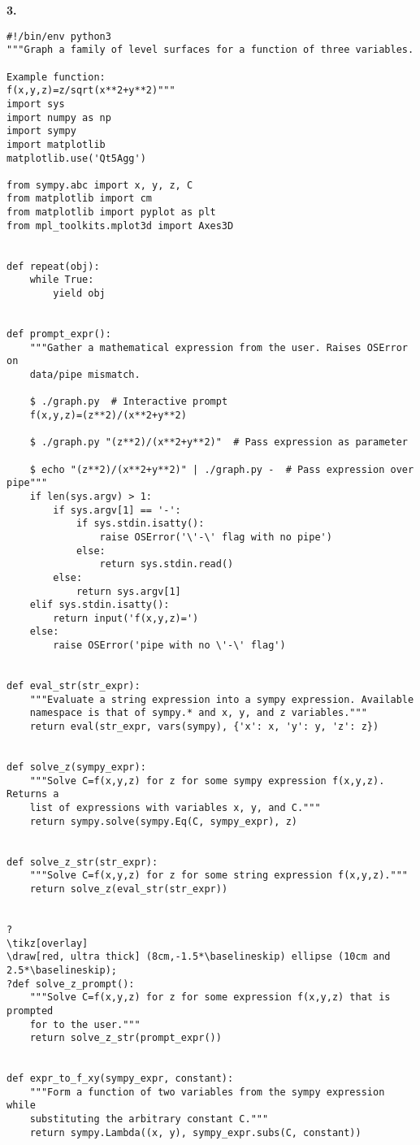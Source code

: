 \documentclass[11pt]{article}
\begin{document}
\textbf{3.}
\begin{lstlisting}
#!/bin/env python3
"""Graph a family of level surfaces for a function of three variables.

Example function:
f(x,y,z)=z/sqrt(x**2+y**2)"""
import sys
import numpy as np
import sympy
import matplotlib
matplotlib.use('Qt5Agg')

from sympy.abc import x, y, z, C
from matplotlib import cm
from matplotlib import pyplot as plt
from mpl_toolkits.mplot3d import Axes3D


def repeat(obj):
    while True:
        yield obj


def prompt_expr():
    """Gather a mathematical expression from the user. Raises OSError on
    data/pipe mismatch.

    $ ./graph.py  # Interactive prompt
    f(x,y,z)=(z**2)/(x**2+y**2)

    $ ./graph.py "(z**2)/(x**2+y**2)"  # Pass expression as parameter

    $ echo "(z**2)/(x**2+y**2)" | ./graph.py -  # Pass expression over pipe"""
    if len(sys.argv) > 1:
        if sys.argv[1] == '-':
            if sys.stdin.isatty():
                raise OSError('\'-\' flag with no pipe')
            else:
                return sys.stdin.read()
        else:
            return sys.argv[1]
    elif sys.stdin.isatty():
        return input('f(x,y,z)=')
    else:
        raise OSError('pipe with no \'-\' flag')


def eval_str(str_expr):
    """Evaluate a string expression into a sympy expression. Available
    namespace is that of sympy.* and x, y, and z variables."""
    return eval(str_expr, vars(sympy), {'x': x, 'y': y, 'z': z})


def solve_z(sympy_expr):
    """Solve C=f(x,y,z) for z for some sympy expression f(x,y,z). Returns a
    list of expressions with variables x, y, and C."""
    return sympy.solve(sympy.Eq(C, sympy_expr), z)


def solve_z_str(str_expr):
    """Solve C=f(x,y,z) for z for some string expression f(x,y,z)."""
    return solve_z(eval_str(str_expr))


?
\tikz[overlay]
\draw[red, ultra thick] (8cm,-1.5*\baselineskip) ellipse (10cm and 2.5*\baselineskip);
?def solve_z_prompt():
    """Solve C=f(x,y,z) for z for some expression f(x,y,z) that is prompted
    for to the user."""
    return solve_z_str(prompt_expr())


def expr_to_f_xy(sympy_expr, constant):
    """Form a function of two variables from the sympy expression while
    substituting the arbitrary constant C."""
    return sympy.Lambda((x, y), sympy_expr.subs(C, constant))



\end{lstlisting}
\end{document}
